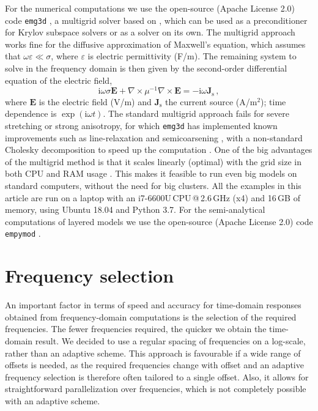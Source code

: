 \documentclass[
    manuscript,
    revised,
  ]{geophysics}
\newcommand{\emg}[2]{\texttt{emg#1#2}\xspace}
\newcommand{\empymod}{\texttt{empymod}\xspace}
\begin{document}
For the numerical computations we use the open-source (Apache License 2.0) code
\emg3d \citep{JOSS.19.Werthmuller}, a multigrid solver based on
\cite{GP.06.Mulder}, which can be used as a preconditioner for Krylov subspace
solvers or as a solver on its own. The multigrid approach works fine for the
diffusive approximation of Maxwell's equation, which assumes that
$\omega\varepsilon \ll \sigma$, where $\varepsilon$ is electric permittivity
(F/m). The remaining system to solve in the frequency domain is then given by
the second-order differential equation of the electric field,
%
\begin{equation}
    \mathrm{i}\omega\sigma \mathbf{E} +
    \nabla \times \mu^{-1} \nabla \times \mathbf{E}
    = -\mathrm{i}\omega\mathbf{J}_\mathrm{s} \, ,
  \label{eq:maxwell}
\end{equation}
%
where $\mathbf{E}$ is the electric field (V/m) and $\mathbf{J}_\mathrm{s}$ the
current source (A/m$^2$); time dependence is $\exp(\mathrm{i}\omega t)$. The
standard multigrid approach fails for severe stretching or strong anisotropy,
for which \emg3d has implemented known improvements such as line-relaxation and
semicoarsening \citep{ECCFD.06.Jonsthovel}, with a non-standard Cholesky
decomposition to speed up the computation \citep{GEO.08.Mulder}. One of the big
advantages of the multigrid method is that it scales linearly (optimal) with
the grid size in both CPU and RAM usage \citep{B.Springer.20.Mulder}. This
makes it feasible to run even big models on standard computers, without the
need for big clusters. All the examples in this article are run on a laptop
with an i7-6600U\,CPU\,@\,2.6\,GHz (x4) and 16\,GB of memory, using Ubuntu
18.04 and Python 3.7. For the semi-analytical computations of layered models we
use the open-source (Apache License 2.0) code \empymod
\citep{GEO.17.Werthmuller}.

\section{Frequency selection}

An important factor in terms of speed and accuracy for time-domain responses
obtained from frequency-domain computations is the selection of the required
frequencies. The fewer frequencies required, the quicker we obtain the
time-domain result. We decided to use a regular spacing of frequencies on a
log-scale, rather than an adaptive scheme. This approach is favourable if a
wide range of offsets is needed, as the required frequencies change with offset
and an adaptive frequency selection is therefore often tailored to a single
offset. Also, it allows for straightforward parallelization over frequencies,
which is not completely possible with an adaptive scheme.
\end{document}
